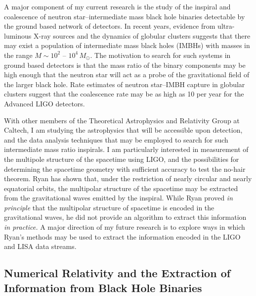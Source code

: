 A major component of my current research is the study of the inspiral and
coalescence of neutron star--intermediate mass black hole binaries detectable
by the ground based network of detectors. In recent years, evidence from
ultra-luminous X-ray sources and the dynamics of globular clusters suggests
that there may exist a population of intermediate mass black holes (IMBHs) with
masses in the range $M \sim 10^2$ -- $10^4\,M_\odot$\cite{Miller:2003sc}.
The motivation to search for such systems in ground based detectors is that
the mass ratio of the binary components may be high enough that the neutron
star will act as a probe of the gravitational field of the larger black
hole.  Rate estimates of neutron star--IMBH capture in globular clusters
suggest that the coalescence rate may be as high as 10 per year for the
Advanced LIGO detectors.

With other members of the Theoretical Astrophysics and Relativity Group at
Caltech, I am studying the astrophysics that will be accessible upon
detection, and the data analysis techniques that may be employed to search for
such intermediate mass ratio inspirals. I am particularly interested in
measurement of the multipole structure of the spacetime using LIGO, and the
possibilities for determining the spacetime geometry with sufficient accuracy
to test the no-hair theorem.  Ryan has shown that, under the restriction of
nearly circular and nearly equatorial orbits, the multipolar structure of the
spacetime may be extracted from the gravitational waves emitted by the
inspiral\cite{Ryan:1995wh}.  While Ryan proved \emph{in principle} that the
multipolar structure of spacetime is encoded in the gravitational waves, he
did not provide an algorithm to extract this information \emph{in practice.} A
major direction of my future research is to explore ways in which Ryan's
methods may be used to extract the information encoded in the LIGO and LISA
data streams.

\subsection{Numerical Relativity and the Extraction of Information from Black
Hole Binaries}

